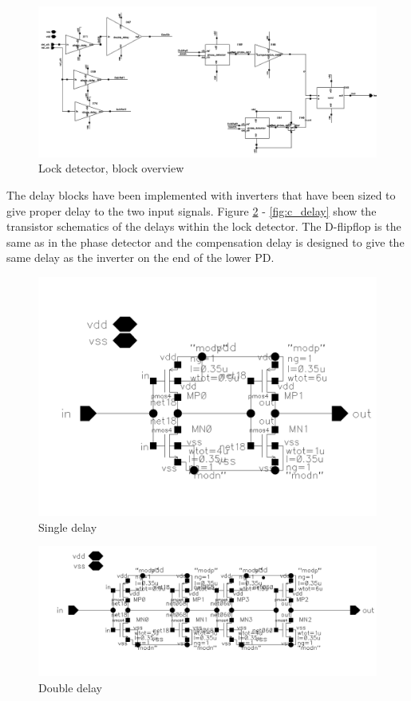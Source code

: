\documentclass[a4paper,12pt]{article} \usepackage{graphicx}
\begin{document}
\begin{figure}[h]
        \centering
        \includegraphics[width=150mm]{../Bilder/LD_tran/LockDetector.png}
        \caption{Lock detector, block overview}
        \label{fig:LD_block}
\end{figure}


The delay blocks have been implemented with inverters that have been
sized to give proper delay to the two input signals. Figure
\ref{fig:s_delay} - \ref{fig:c_delay} show the transistor schematics of the
delays within the lock detector. The D-flipflop is the same as in the
phase detector and the compensation delay is designed to give the same delay
as the inverter on the end of the lower PD.

\begin{figure}[h]
        \centering
        \includegraphics[width=150mm]{../Bilder/LD_tran/single_delay.png}
        \caption{Single delay}
        \label{fig:s_delay}
\end{figure}

\begin{figure}[h]
        \centering
        \includegraphics[width=150mm]{../Bilder/LD_tran/double_delay.png}
        \caption{Double delay}
        \label{fig:d_delay}
\end{figure}
\end{document}
